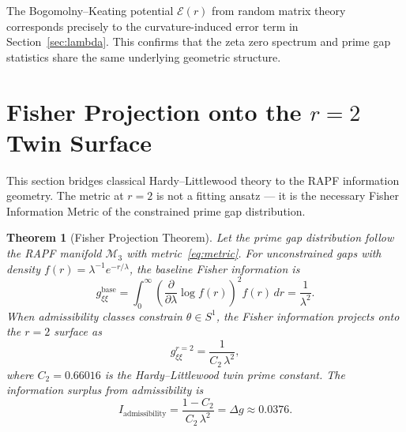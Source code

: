 \documentclass[12pt]{article}
\newtheorem{theorem}{Theorem}[section]
\begin{document}
The Bogomolny--Keating potential $\mathcal{E}(r)$ from random matrix theory
corresponds precisely to the curvature-induced error term in Section~\ref{sec:lambda}.
This confirms that the zeta zero spectrum and prime gap statistics share the same
underlying geometric structure.

\section{Fisher Projection onto the $r=2$ Twin Surface}

This section bridges classical Hardy--Littlewood theory to the RAPF information
geometry. The metric at $r=2$ is not a fitting ansatz --- it is the necessary
Fisher Information Metric of the constrained prime gap distribution.

\begin{theorem}[Fisher Projection Theorem]
Let the prime gap distribution follow the RAPF manifold $\mathcal{M}_3$ with
metric~\eqref{eq:metric}. For unconstrained gaps with density
$f(r) = \lambda^{-1} e^{-r/\lambda}$, the baseline Fisher information is
\begin{equation}
  g_{\xi\xi}^{\text{base}}
  = \int_0^\infty \left(\frac{\partial}{\partial\lambda} \log f(r)\right)^2
    f(r)\,dr = \frac{1}{\lambda^2}.
  \label{eq:fisher_base}
\end{equation}
When admissibility classes constrain $\theta \in S^1$, the Fisher information
projects onto the $r=2$ surface as
\begin{equation}
  g_{\xi\xi}^{r=2} = \frac{1}{C_2\,\lambda^2},
  \label{eq:fisher_r2}
\end{equation}
where $C_2 = 0.66016$ is the Hardy--Littlewood twin prime constant.
The information surplus from admissibility is
\[
  I_{\text{admissibility}} = \frac{1 - C_2}{C_2\,\lambda^2}
  = \Delta g \approx 0.0376.
\]
\end{theorem}
\label{thm:fisher}
\end{document}

